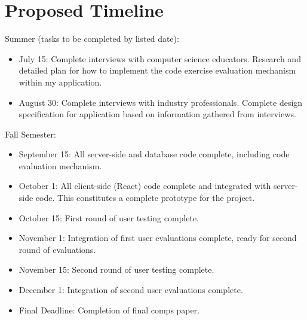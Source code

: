 \documentclass[10pt,twocolumn]{article}
\begin{document}
\section{Proposed Timeline}

Summer (tasks to be completed by listed date):

\begin{itemize}
    \item{July 15: Complete interviews with computer science educators. Research and detailed plan for how to implement 
    the code exercise evaluation mechanism within my application.}
    \item{August 30: Complete interviews with industry professionals. Complete design specification for application
    based on information gathered from interviews.}
\end{itemize}

Fall Semester:

\begin{itemize}
    \item{September 15: All server-side and database code complete, including code evaluation mechanism.}
    \item{October 1: All client-side (React) code complete and integrated with server-side code. This constitutes a 
    complete prototype for the project.}
    \item{October 15: First round of user testing complete.}
    \item{November 1: Integration of first user evaluations complete, ready for second round of evaluations.}
    \item{November 15: Second round of user testing complete.}
    \item{December 1: Integration of second user evaluations complete.}
    \item{Final Deadline: Completion of final comps paper.}
\end{itemize}

\printbibliography 
\end{document}
